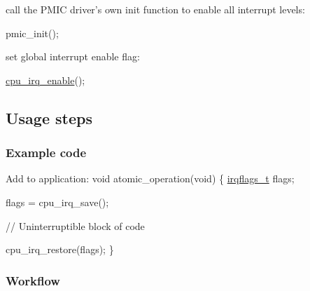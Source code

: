 \begin{DoxyEnumerate}
\item call the P\-M\-I\-C driver's own init function to enable all interrupt levels\-:
\begin{DoxyItemize}
\item 
\begin{DoxyCode}
 pmic\_init(); 
\end{DoxyCode}

\end{DoxyItemize}
\item set global interrupt enable flag\-:
\begin{DoxyItemize}
\item 
\begin{DoxyCode}
 \hyperlink{group__interrupt__group_gae4922a4bd8ba4150211fbc7f2302403c}{cpu\_irq\_enable}(); 
\end{DoxyCode}

\end{DoxyItemize}
\end{DoxyEnumerate}\hypertarget{pmic_use_case_1_pmic_use_case_1_usage}{}\subsection{Usage steps}\label{pmic_use_case_1_pmic_use_case_1_usage}
\hypertarget{pmic_use_case_1_pmic_use_case_1_usage_code}{}\subsubsection{Example code}\label{pmic_use_case_1_pmic_use_case_1_usage_code}

\begin{DoxyCode}
         Add to application:
         \textcolor{keywordtype}{void} atomic\_operation(\textcolor{keywordtype}{void})
         \{
             \hyperlink{group__interrupt__group_ga9aa1f52defc97531b6343233abeea613}{irqflags\_t} flags;

             flags = cpu\_irq\_save();

             \textcolor{comment}{// Uninterruptible block of code}

             cpu\_irq\_restore(flags);
         \}
\end{DoxyCode}
\hypertarget{pmic_use_case_1_pmic_use_case_1_usage_flow}{}\subsubsection{Workflow}\label{pmic_use_case_1_pmic_use_case_1_usage_flow}

